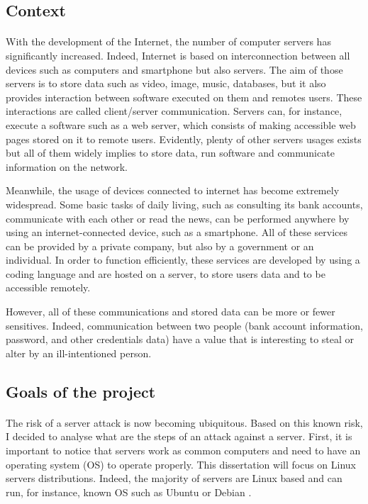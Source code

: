 \subsection{Context}

\paragraph{} %
With the development of the Internet, the number of computer servers has significantly
increased. Indeed, Internet is based on interconnection between all devices such as computers
and smartphone but also servers. The aim of those servers is to store data such as video,
 image, music, databases, but it also provides interaction between software executed on them and 
 remotes users. These interactions are called client/server communication. Servers can, for 
 instance, execute a software such as a web server, which consists of making accessible web pages
 stored on it to remote users. Evidently, plenty of other servers usages exists but all of them
 widely implies to store data, run software and communicate information on the network.
 
Meanwhile, the usage of devices connected to internet has become extremely widespread. Some
basic tasks of daily living, such as consulting its bank accounts, communicate with each other
 or read the news, can be performed anywhere by using an internet-connected device, such as a
 smartphone.
All of these services can be provided by a private company, but also by a government or an
 individual. In order to function efficiently, these services are developed by using a 
 coding language and are hosted on a server, to store users data and to be accessible remotely. 

However, all of these communications and stored data can be more or fewer sensitives. Indeed, 
communication between two people (bank account information, password, and other credentials data)
 have a value that is interesting to steal or alter by an ill-intentioned person.

\subsection{Goals of the project} %

\paragraph{}

The risk of a server attack is now becoming ubiquitous. Based on this known risk, I decided
 to analyse what are the steps of an attack against a server. First, it is important to notice that servers work as common
 computers and need to have an operating system (OS) to operate properly. This dissertation will
 focus on Linux servers distributions. Indeed, the majority of servers are Linux based and
 can run, for instance, known OS such as Ubuntu \cite{ubuntu} or Debian \cite{debian}.
 
